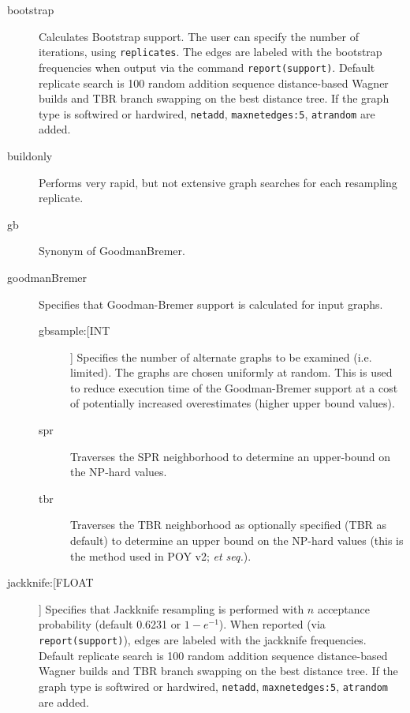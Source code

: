 		\begin{description}
		

		\item[bootstrap] Calculates Bootstrap support. The user can specify the number of 
		iterations, using \texttt{replicates}. The edges are labeled with the bootstrap 
		frequencies when output via the command \texttt{report(support)}. Default replicate 
		search is 100 random addition sequence distance-based Wagner builds and TBR 
		branch swapping on the best distance tree. If the graph type is softwired or hardwired, 
		\texttt{netadd}, \texttt{maxnetedges:5}, \texttt{atrandom} are added. 
		
		\item[buildonly] Performs very rapid, but not extensive graph searches for each 
		resampling replicate.
		
		\item[gb] Synonym of GoodmanBremer.
			
		\item[goodmanBremer] Specifies that Goodman-Bremer support is 
		calculated for input graphs. 
			
		\begin{description}
			
			\item[gbsample:[INT]] Specifies the number of alternate graphs to be examined 
			(i.e. limited). The graphs are chosen uniformly at random.  This is used to reduce 
			execution time of the Goodman-Bremer support at a cost of potentially increased 
			overestimates (higher upper bound values). 
			
			\item[spr] Traverses the SPR neighborhood to determine an upper-bound on 
			the NP-hard values.
			
			\item[tbr] Traverses the TBR neighborhood 
			as optionally specified (TBR as default) to determine an upper bound on the NP-hard 
			values (this is the method used in POY v2; \citealp{POY2} \textit{et seq.}).
			
		\end{description}
		
		\item[jackknife:[FLOAT]] Specifies that Jackknife resampling is performed with $n$ 
		acceptance probability (default 0.6231 or $1 - e^{-1}$). When reported (via 
		\texttt{report(support)}), edges are labeled with the jackknife frequencies. Default 
		replicate search is 100 random addition sequence distance-based Wagner builds 
		and TBR branch swapping on the best distance tree. If the graph type is softwired 
		or hardwired, \texttt{netadd}, \texttt{maxnetedges:5}, \texttt{atrandom} are added. 
		

\end{description}
